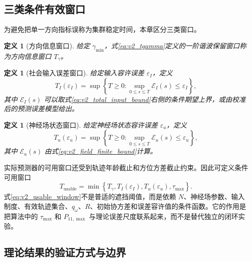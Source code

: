 \documentclass[UTF8,fontset=windows,11pt]{ctexart}
\theoremstyle{cnplain}
\newtheorem{definition}[theorem]{定义}
\numberwithin{equation}{section}
\begin{document}
\subsection{三类条件有效窗口}

为避免把单一方向指标误称为集群稳定时间，本章区分三类窗口。

\begin{definition}[方向信息窗口]
\label{def:v2_direction_window}
给定 $\gamma_{\min}$，式\eqref{eq:v2_tgamma}定义的一阶谐波保留窗口称为方向信息窗口 $T_\gamma$。
\end{definition}

\begin{definition}[社会输入误差窗口]
\label{def:v2_input_window}
给定输入容许误差 $\varepsilon_I$，定义
\begin{equation}
 T_I(\varepsilon_I)=\sup\left\{T\ge0:
 \sup_{0\le s\le T}\mathcal E_I(s)\le\varepsilon_I\right\},
 \label{eq:v2_input_window}
\end{equation}
其中 $\mathcal E_I(s)$ 可以取式\eqref{eq:v2_total_input_bound}右侧的条件期望上界，或由校准后的预测误差模型给出。
\end{definition}

\begin{definition}[神经场状态窗口]
\label{def:v2_field_window}
给定神经场状态容许误差 $\varepsilon_u$，定义
\begin{equation}
 T_u(\varepsilon_u)=\sup\left\{T\ge0:
 \sup_{0\le s\le T}\mathcal E_u(s)\le\varepsilon_u\right\},
 \label{eq:v2_field_window}
\end{equation}
其中 $\mathcal E_u(s)$ 由式\eqref{eq:v2_field_finite_bound}计算。
\end{definition}

实际预测器的可用窗口还受到轨迹年龄截止和方位方差截止约束。因此可定义条件可用窗口
\begin{equation}
 T_{\mathrm{usable}}
 =\min\left\{T_\gamma,
 T_I(\varepsilon_I),
 T_u(\varepsilon_u),
 \tau_{\max}\right\}.
 \label{eq:v2_usable_window}
\end{equation}
式\eqref{eq:v2_usable_window}不是普适的遮挡阈值，而是依赖 $N$、神经场参数、输入制度、有效轨迹集合、$q_\omega$、$R$、初始协方差和误差容许值的条件函数。它的作用是把算法中的 $\tau_{\max}$ 和 $P_{11,\max}$ 与理论误差尺度联系起来，而不是替代独立的闭环实验。

\subsection{理论结果的验证方式与边界}
\end{document}
